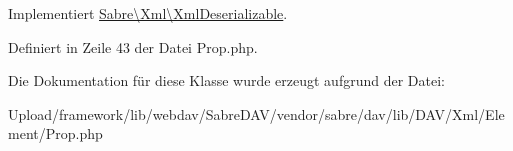 Implementiert \mbox{\hyperlink{interface_sabre_1_1_xml_1_1_xml_deserializable_a19e0eca545b9a0d93f7d6b69085ade30}{Sabre\textbackslash{}\+Xml\textbackslash{}\+Xml\+Deserializable}}.



Definiert in Zeile 43 der Datei Prop.\+php.



Die Dokumentation für diese Klasse wurde erzeugt aufgrund der Datei\+:\begin{DoxyCompactItemize}
\item 
Upload/framework/lib/webdav/\+Sabre\+D\+A\+V/vendor/sabre/dav/lib/\+D\+A\+V/\+Xml/\+Element/Prop.\+php\end{DoxyCompactItemize}

